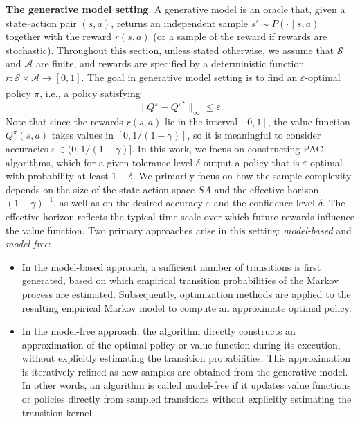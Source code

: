 \documentclass{article}
\numberwithin{equation}{section}
\newcommand{\cA}{\mathcal{A}}
\newcommand{\cS}{\mathcal{S}}
\begin{document}
\textbf{The generative model setting}. A generative model is an oracle that, given a state–action pair $(s,a)$, returns an independent sample $s'\sim P(\cdot\mid s,a)$ together with the reward $r(s,a)$ (or a sample of the reward if rewards are stochastic).
Throughout this section, unless stated otherwise, we assume that \(\cS\) and \(\cA\) are finite, and rewards are specified by a deterministic function \(r : \cS\times\cA\xrightarrow[]{} [0,1]\).
The goal in generative model setting is to find an \(\varepsilon\)-optimal policy \(\pi\), i.e., a policy satisfying
\[
\|Q^\pi - Q^{\pi^{\star}}\|_\infty \le \varepsilon.
\]  
Note that since the rewards \(r(s,a)\) lie in the interval \([0,1]\), the value function \(Q^\pi(s,a)\) takes values in \([0, 1/(1-\gamma)]\), so it is meaningful to consider accuracies \(\varepsilon \in \bigl(0, 1/(1-\gamma)\bigr]\). In this work, we focus on constructing PAC algorithms, which for a given tolerance level \(\delta\) output a policy that is \(\varepsilon\)-optimal with probability at least \(1-\delta\). We primarily focus on how the sample complexity depends on the size of the state-action space \(SA\) and the effective horizon \((1-\gamma)^{-1}\), as well as on the desired accuracy \(\varepsilon\) and the confidence level \(\delta\). The effective horizon reflects the typical time scale over which future rewards influence the value function. Two primary approaches arise in this setting: \textit{model-based} and \textit{model-free}:
\begin{itemize}
    \item In the model-based approach, a sufficient number of transitions is first generated, based on which empirical transition probabilities of the Markov process are estimated. Subsequently, optimization methods are applied to the resulting empirical Markov model to compute an approximate optimal policy.
    
    \item In the model-free approach, the algorithm directly constructs an approximation of the optimal policy or value function during its execution, without explicitly estimating the transition probabilities. This approximation is iteratively refined as new samples are obtained from the generative model. In other words, an algorithm is called model-free if it updates value functions or policies directly from sampled transitions without explicitly estimating the transition kernel.
\end{itemize}
\end{document}
